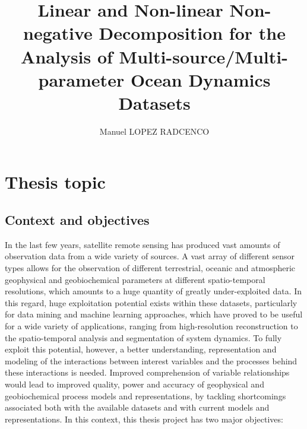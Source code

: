 \documentclass[10pt]{extarticle}
\title{Linear and Non-linear Non-negative Decomposition for the Analysis of Multi-source/Multi-parameter Ocean Dynamics Datasets}
\author{Manuel LOPEZ RADCENCO}
\date{\vspace{-5ex}}
\begin{document}
\maketitle
\section*{Thesis topic}

\subsection*{Context and objectives}
In the last few years, satellite remote sensing has produced vast amounts of observation data from a wide variety of sources. A vast array of different sensor types %
allows for the observation of different terrestrial, oceanic and atmospheric geophysical and geobiochemical parameters  %
at different spatio-temporal resolutions, which amounts to a huge quantity of greatly under-exploited data. In this regard, huge exploitation potential exists within these datasets, particularly for data mining and machine learning approaches, which have proved to be %
useful for a wide variety of applications, ranging from high-resolution reconstruction to the spatio-temporal analysis and segmentation of system dynamics.
To fully exploit this potential, however, a better understanding, representation and modeling of the interactions between interest variables and the processes behind these interactions is needed. Improved comprehension of variable relationships would lead to improved quality, power and accuracy of geophysical and geobiochemical process models and representations, by tackling  shortcomings associated both with the available datasets %
and with current models and representations. %
In this context, this thesis project has two major objectives:
\end{document}
